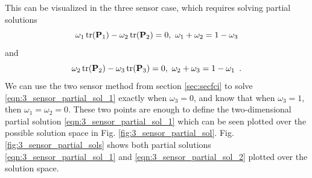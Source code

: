\documentclass[letterpaper, 10 pt, conference]{ieeeconf}  %
\begin{document}
This can be visualized in the three sensor case, which requires solving partial solutions
\begin{equation}
   \omega_1 \operatorname{tr}({{\mathbf{P}}}_1) - \omega_2 \operatorname{tr}({{\mathbf{P}}}_2) = 0,\ \omega_1+\omega_2=1-\omega_3 \label{eqn:3_sensor_partial_sol_1}
\end{equation}
and
\begin{equation}
   \omega_2 \tr(\mP_2) - \omega_3 \tr(\mP_3) = 0,\ \omega_2+\omega_3=1-\omega_1\enspace. \label{eqn:3_sensor_partial_sol_2}
\end{equation}
We can use the two sensor method from section \ref{sec:secfci} to solve \eqref{eqn:3_sensor_partial_sol_1} exactly when $\omega_3=0$, and know that when $\omega_3=1$, then $\omega_1=\omega_2=0$. These two points are enough to define the two-dimensional partial solution \eqref{eqn:3_sensor_partial_sol_1} which can be seen plotted over the possible solution space in Fig. \ref{fig:3_sensor_partial_sol}. Fig. \ref{fig:3_sensor_partial_sols} shows both partial solutions \eqref{eqn:3_sensor_partial_sol_1} and \eqref{eqn:3_sensor_partial_sol_2} plotted over the solution space.
\end{document}
